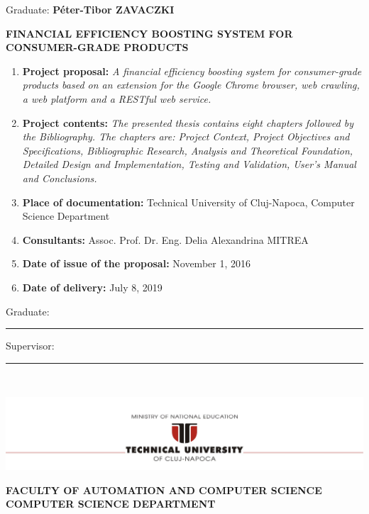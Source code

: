 \documentclass[12pt,a4paper,twoside]{report}
\renewcommand{\thesisauthor}{Péter-Tibor ZAVACZKI}    %
\renewcommand{\thesistitle}{FINANCIAL EFFICIENCY BOOSTING SYSTEM FOR CONSUMER-GRADE PRODUCTS}
\renewcommand{\thesissupervisor}{Assoc. Prof. Dr. Eng. Delia Alexandrina MITREA}
\newcommand{\department}{\bf FACULTY OF AUTOMATION AND COMPUTER SCIENCE\\
COMPUTER SCIENCE DEPARTMENT}
\newcommand{\utcnlogo}{\includegraphics[width=15cm]{img/tucn.jpg}}
\newcommand{\uline}[1]{\rule[0pt]{#1}{0.4pt}}
\begin{document}
\vspace{1.6cm}

\begin{center}
  Graduate: {\bf \thesisauthor}

  \vspace{0.6cm}

  {\bf \thesistitle}
\end{center}

\vspace{1cm}

\begin{enumerate}
  \item {\bf Project proposal:} {\it A financial efficiency boosting system for consumer-grade products based on an extension for the Google Chrome browser, web crawling, a web platform and a RESTful web service.}
  \item {\bf Project contents:} {\it The presented thesis contains eight chapters followed by the Bibliography. The chapters are: Project Context, Project Objectives and Specifications, Bibliographic Research, Analysis and Theoretical Foundation, Detailed Design and Implementation, Testing and Validation, User's Manual and Conclusions.}
  \item {\bf Place of documentation:} Technical University of Cluj-Napoca, Computer Science Department
  \item {\bf Consultants:} \thesissupervisor
  \item {\bf Date of issue of the proposal:} November 1, 2016
  \item {\bf Date of  delivery:} July 8, 2019
\end{enumerate}

\vspace{1.2cm}
\hspace{6cm} Graduate: \uline{6cm}

\vspace{0.5cm}
\hspace{6cm} Supervisor: \uline{6cm}

\thispagestyle{empty}
\newpage
$ $


\thispagestyle{empty}
\newpage

\begin{center}
  \utcnlogo

  \department
\end{center}
\end{document}
